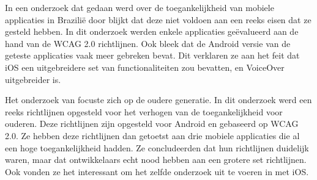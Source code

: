 In een onderzoek dat gedaan werd over de toegankelijkheid van mobiele applicaties in Brazilië door \cite{serra2015accessibility} blijkt dat deze niet voldoen aan een reeks eisen dat ze gesteld hebben. In dit onderzoek werden enkele applicaties geëvalueerd aan de hand van de  WCAG 2.0 richtlijnen. Ook bleek dat de Android versie van de geteste applicaties vaak meer gebreken bevat. Dit verklaren ze aan het feit dat iOS een uitgebreidere set van functionaliteiten zou bevatten, en VoiceOver uitgebreider is.

Het onderzoek van \cite{diaz2014accessibility} focuste zich op de oudere generatie. In dit onderzoek werd een reeks richtlijnen opgesteld voor het verhogen van de toegankelijkheid voor ouderen. Deze richtlijnen zijn opgesteld voor Android en gebaseerd op WCAG 2.0. Ze hebben deze richtlijnen dan getoetst aan drie mobiele applicaties die al een hoge toegankelijkheid hadden. Ze concludeerden dat hun richtlijnen duidelijk waren, maar dat ontwikkelaars echt nood hebben aan een grotere set richtlijnen. Ook vonden ze het interessant om het zelfde onderzoek uit te voeren in met iOS.